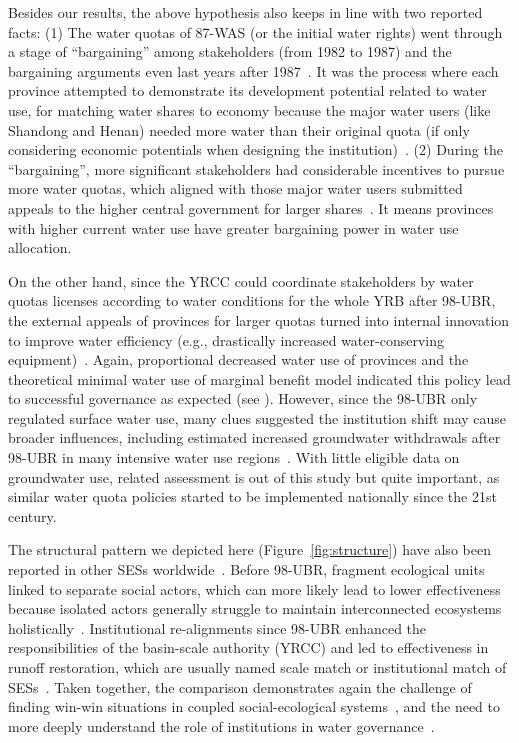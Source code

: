 Besides our results, the above hypothesis also keeps in line with two reported facts:
(1) The water quotas of 87-WAS (or the initial water rights) went through a stage of ``bargaining'' among stakeholders (from 1982 to 1987) and the bargaining arguments even last years after 1987~\cite{wang2019a, wang2019d}.
It was the process where each province attempted to demonstrate its development potential related to water use, for matching water shares to economy because the major water users (like Shandong and Henan) needed more water than their original quota (if only considering economic potentials when designing the institution)~\cite{zuo2020}.
(2) During the ``bargaining'', more significant stakeholders had considerable incentives to pursue more water quotas, which aligned with those major water users submitted appeals to the higher central government for larger shares~\cite{wang2019a, wang2019d}.
It means provinces with higher current water use have greater bargaining power in water use allocation.

On the other hand, since the YRCC could coordinate stakeholders by water quotas licenses according to water conditions for the whole YRB after 98-UBR, the external appeals of provinces for larger quotas turned into internal innovation to improve water efficiency (e.g., drastically increased water-conserving equipment)~\cite{krieger1955, ostrom1990}.
Again, proportional decreased water use of provinces and the theoretical minimal water use of marginal benefit model indicated this policy lead to successful governance as expected (see ).
However, since the 98-UBR only regulated surface water use, many clues suggested the institution shift may cause broader influences, including estimated increased groundwater withdrawals after 98-UBR in many intensive water use regions~\cite{sun2022b}.
With little eligible data on groundwater use, related assessment is out of this study but quite important, as similar water quota policies started to be implemented nationally since the 21st century.

The structural pattern we depicted here (Figure~\ref{fig:structure}) have also been reported in other SESs worldwide~\cite{kluger2020,guerrero2015,bodin2012}.
Before 98-UBR, fragment ecological units linked to separate social actors, which can more likely lead to lower effectiveness because isolated actors generally struggle to maintain interconnected ecosystems holistically~\cite{sayles2017,sayles2019,cai2016,bergsten2019}.
Institutional re-alignments since 98-UBR enhanced the responsibilities of the basin-scale authority (YRCC) and led to effectiveness in runoff restoration, which are usually named scale match or institutional match of SESs~\cite{cumming2020a,wang2019d}.
Taken together, the comparison demonstrates again the challenge of finding win-win situations in coupled social-ecological systems~\cite{hegwood2022}, and the need to more deeply understand the role of institutions in water governance~\cite{bergsten2019, sayles2019}.

